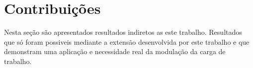 

\section{Contribuições}
Nesta seção são apresentados resultados indiretos as este trabalho. Resultados que só foram possiveis mediante a extensão desenvolvida por este trabalho e que demonstram uma aplicação e necessidade real da modulação da carga de trabalho.

